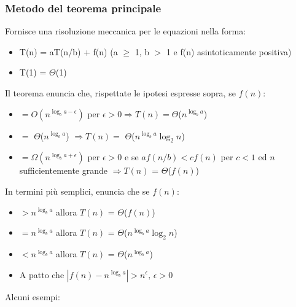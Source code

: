 \documentclass{report}
\newcommand{\T}[1]{$\Theta$(#1)}
\begin{document}
            \subsubsection{Metodo del teorema principale}
                Fornisce una risoluzione meccanica per le equazioni nella forma:
                \begin{itemize}
                    \item T(n) = aT(n/b) + f(n) (a $\geq$ 1, b $>$ 1 e f(n) asintoticamente positiva)
                    \item T(1) = \T{1}
                \end{itemize}
                Il teorema enuncia che, rispettate le ipotesi espresse sopra, se $f\left(n\right)$:
                \begin{itemize}
                    \item $= O\left(n^{\log_ba-\epsilon}\right)$ per $\epsilon > 0 
                        \Longrightarrow T\left(n\right) = $\T{$n^{\log_ba}$}
                    \item $= $ \T{$n^{\log_ba}$} $
                        \Longrightarrow T\left(n\right) = $ \T{$n^{\log_ba}\log_2n$}
                    \item $= \Omega\left(n^{\log_ba+\epsilon}\right)$ per $\epsilon > 0$ e 
                        se $af\left(n/b\right) < cf\left(n\right)$ per $c < 1$ ed $n$ sufficientemente
                        grande $\Longrightarrow T\left(n\right)$ = \T{$f\left(n\right)$}
                \end{itemize}
                In termini più semplici, enuncia che se $f\left(n\right)$:
                \begin{itemize}
                    \item $> n^{\log_ba}$ allora $T\left(n\right)$ = \T{$f\left(n\right)$}
                    \item $= n^{\log_ba}$ allora $T\left(n\right)$ = \T{$n^{\log_ba}\log_2n$}
                    \item $< n^{\log_ba}$ allora $T\left(n\right)$ = \T{$n^{\log_ba}$}
                    \item A patto che $|f\left(n\right) - n^{\log_ba}| > n^\epsilon, \, \epsilon > 0$   
                \end{itemize}
                Alcuni esempi:
\end{document}
